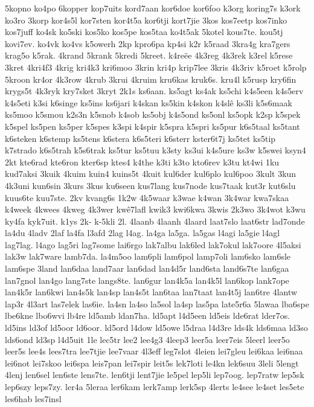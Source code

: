 5kopno
ko4po
6kopper
kop7uits
kord7aan
kor6doe
kor6foo
k3org
koring7s
k3ork
ko3ro
3korp
kor4s5l
kor7sten
kor4t5a
kor6tji
kort7jie
3kos
kos7eetp
kos7inko
kos7juff
ko4sk
ko5ski
kos5ko
kos5pe
kos5taa
ko4t5ak
5kotel
kous7te.
kou5tj
kovi7ev.
ko4vk
ko4vs
k5owerh
2kp
kpro6pa
kp4si
k2r
k5raad
3kra4g
kra7gers
krag5o
k5rak.
4krand
5krank
5kredi
5kreet.
k4reëe
4k3reg
4k3rek
k3rel
k5rese
3kret
4kri4f3
4krig
kri4k3
kri6moo
3krin
kri4p
krip7lee
3kris
4k3riv
k5roet
k5rolp
5kroon
kr4or
4k3row
4krub
3krui
4kruim
kru6kas
kruk6s.
kru4l
k5rusp
kry6fin
krygs5t
4k3ryk
kry7sket
3kryt
2k1s
ks6aan.
ks5agt
ks4ak
ks5chi
k4s5een
k4s5erv
k4s5eti
k3si
k6singe
ks5ins
ks6jari
k4skan
ks5kin
k4skon
k4slê
ks3li
k5s6maak
ks5moo
k5smou
k2s3n
k5snob
k4sob
ks5obj
k4s5ond
ks5onl
ks5opk
k2sp
k5spek
k5spel
ks5pen
ks5per
k5spes
k3spi
k4spir
k5spra
k5spri
ks5pur
k6s5taal
ks5tant
k6steken
k6stemp
ks5tens
k6stera
k6s5teri
k6sterr
kster6t7j
ks5tet
ks5tip
k7strado
k6s5trah
k5s6trak
ks5tur
ks5tuu
k3sty
ks3ui
k4s5ure
ks3w
k5swei
ksyn4
2kt
kte6rad
kte6ron
kter6sp
ktes4
k4the
k3ti
k3to
kto6rev
k3tu
kt4wi
1ku
kud7aksi
3kuik
4kuim
kuin4
kuins5t
4kuit
kul6der
kul6plo
kul6poo
3kult
3kun
4k3uni
kun6sin
3kurs
3kus
ku6seen
kus7lang
kus7node
kus7taak
kut3r
kut6slu
kuus6te
kuu7ste.
2kv
kvang6s
1k2w
4k5waar
k3wae
k4wan
3k4war
kwa7skaa
k4week
4kwees
4kweg
4k3wer
kwê7lafl
kwik3
kwi6kwa
3kwis
2k3wo
3k4wot
k3wu
ky4fa
kyk7uit.
k1ys
2k-
k-5kli
2l.
4laanb
4laanh
4laard
laat7slo
laat6str
lad7onde
la4du
4ladv
2laf
la4fa
l3afd
2lag
l4ag.
la4ga
la5ga.
la5gas
l4agi
la5gie
l4agl
lag7lag.
l4ago
lag5ri
lag7some
lai6rgo
lak7albu
lak6led
lak7okul
lak7oore
4l5aksi
lak3w
lak7ware
lamb7da.
la4m5oo
lam6pli
lam6pol
lamp7oli
lam6sko
lam6sle
lam6spe
3land
lan6daa
land7aar
lan6dad
lan4d5r
land6sta
land6s7te
lan6gaa
lan7gnol
lan4go
lang7ste
langs8te.
lan6gur
lan4k5a
lan4k5l
lan6kop
lank7ope
lan4k5r
lan6kwi
lan4s5k
lan4sp
lan4s5t
lan6taa
lan7taat
lan4t5j
lan6tre
4lantw
lap3r
4l3art
las7elek
las6ie.
la4sn
la4so
la5sol
la4sp
las5pa
late5r6a
5lawaa
lba6spe
lbe6kne
lbo6wvi
lb4re
ld5amb
ldan7ha.
ld5apt
l4d5een
ld5eis
lde6rat
lder7os.
ld5ins
ld3of
ld5oor
ld6oor.
ld5ord
l4dow
ld5owe
l5draa
l4d3re
lds4k
lds6maa
ld3so
lds6ond
ld3sp
l4d5uit
1le
lec5tr
lee2
lee4g3
4leep3
leer5a
leer7eis
5leerl
leer5o
leer5s
lee4s
lees7tra
lee7tjie
lee7vaar
4l3eff
leg7slot
4leien
lei7gleu
lei6kaa
lei6naa
lei6not
lei7skoo
lei6spa
leis7pan
lei7spir
leit5s
lek7loti
le4kn
lek6suu
3leli
5lengt
4lenj
len6sel
len6ste
lens7te.
len6tji
lent7jie
le5pel
lep5li
lep7oog.
lep7ratw
lep5sk
lep6szy
leps7zy.
ler4a
5leraa
ler6kam
lerk7amp
lerk5sp
4lerts
le4see
le4set
les5ete
les6hab
les7insl
